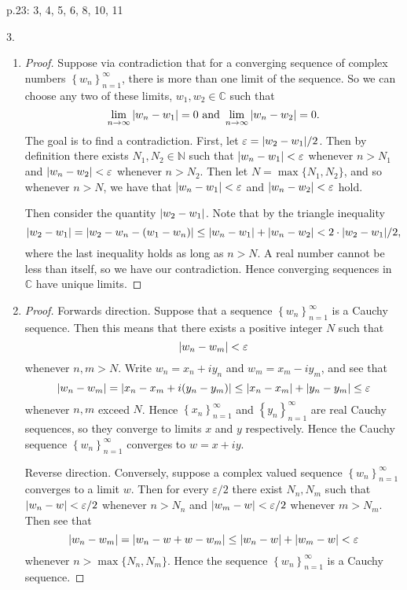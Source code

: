 \documentclass[11pt]{article}
\newcommand{\cbr}[1]{\left\{#1\right\}}
\begin{document}
p.23: 3, 4, 5, 6, 8, 10, 11

3.\begin{enumerate}[label=(\alph*)]
  \item \begin{proof}
    Suppose via contradiction that for a converging sequence of complex numbers $\cbr{w_n}_{n=1}^{\infty}$, there is more than one limit of the sequence. So we can choose any two of these limits, $w_1,w_2\in \mathbb{C}$ such that \[\lim_{n\to\infty}\abs{w_n-w_1} = 0 \text{ and } \lim_{n\to\infty}\abs{w_n-w_2} = 0.\] The goal is to find a contradiction. First, let $\varepsilon = \abs{w_2-w_1}/2$. Then by definition there exists $N_1,N_2 \in \mathbb{N}$ such that $\abs{w_n-w_1} < \varepsilon$ whenever $n > N_1$ and $\abs{w_n-w_2} < \varepsilon$ whenever $n > N_2$. Then let $N = \max\{N_1,N_2\}$, and so whenever $n>N$, we have that $\abs{w_n-w_1} < \varepsilon$ and $\abs{w_n-w_2} < \varepsilon$ hold.

    Then consider the quantity $\abs{w_2-w_1}$. Note that by the triangle inequality \[\abs{w_2-w_1} = \abs{w_2-w_n-(w_1-w_n)}\leq \abs{w_n-w_1} + \abs{w_n-w_2} < 2\cdot\abs{w_2-w_1}/2,\] where the last inequality holds as long as $n>N$. A real number cannot be less than itself, so we have our contradiction. Hence converging sequences in $\mathbb{C}$ have unique limits.
  \end{proof}

  \item \begin{proof}
    Forwards direction. Suppose that a sequence $\cbr{w_n}_{n=1}^{\infty}$ is a Cauchy sequence. Then this means that there exists a positive integer $N$ such that \[\abs{w_n-w_m} < \varepsilon\] whenever $n,m > N$. Write $w_n = x_n+iy_n$ and $w_m = x_m-iy_m$, and see that \[\abs{w_n-w_m} = \abs{x_n-x_m+i(y_n-y_m)} \leq \abs{x_n-x_m} + \abs{y_n-y_m} \leq \varepsilon\] whenever $n,m$ exceed $N$. Hence $\cbr{x_n}_{n=1}^{\infty}$ and $\cbr{y_n}_{n=1}^{\infty}$ are real Cauchy sequences, so they converge to limits $x$ and $y$ respectively. Hence the Cauchy sequence $\cbr{w_n}_{n=1}^{\infty}$ converges to $w = x+iy$. 

    Reverse direction. Conversely, suppose a complex valued sequence $\cbr{w_n}_{n=1}^{\infty}$ converges to a limit $w$. Then for every $\varepsilon/2$ there exist $N_n,N_m$ such that $\abs{w_n-w} < \varepsilon/2$ whenever $n>N_n$ and $\abs{w_m-w} < \varepsilon/2$ whenever $m>N_m$. Then see that \[\abs{w_n-w_m} = \abs{w_n-w+w-w_m}\leq \abs{w_n-w} + \abs{w_m-w} < \varepsilon\] whenever $n > \max\{N_n,N_m\}$. Hence the sequence $\cbr{w_n}_{n=1}^{\infty}$ is a Cauchy sequence.
  \end{proof}


\end{enumerate}
\end{document}
